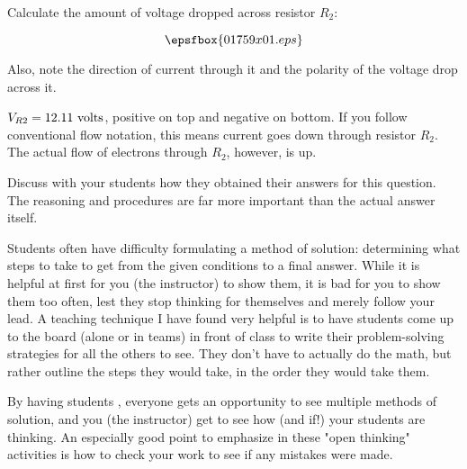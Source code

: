 

Calculate the amount of voltage dropped across resistor $R_2$:

$$\epsfbox{01759x01.eps}$$

Also, note the direction of current through it and the polarity of the voltage drop across it.







$V_{R2} = 12.11 \hbox{ volts}$, positive on top and negative on bottom.  If you follow conventional flow notation, this means current goes down through resistor $R_2$.  The actual flow of electrons through $R_2$, however, is up.







Discuss with your students how they obtained their answers for this question.  The reasoning and procedures are far more important than the actual answer itself.

\vskip 10pt

Students often have difficulty formulating a method of solution: determining what steps to take to get from the given conditions to a final answer.  While it is helpful at first for you (the instructor) to show them, it is bad for you to show them too often, lest they stop thinking for themselves and merely follow your lead.  A teaching technique I have found very helpful is to have students come up to the board (alone or in teams) in front of class to write their problem-solving strategies for all the others to see.  They don't have to actually do the math, but rather outline the steps they would take, in the order they would take them.

By having students , everyone gets an opportunity to see multiple methods of solution, and you (the instructor) get to see how (and if!) your students are thinking.  An especially good point to emphasize in these "open thinking" activities is how to check your work to see if any mistakes were made.




